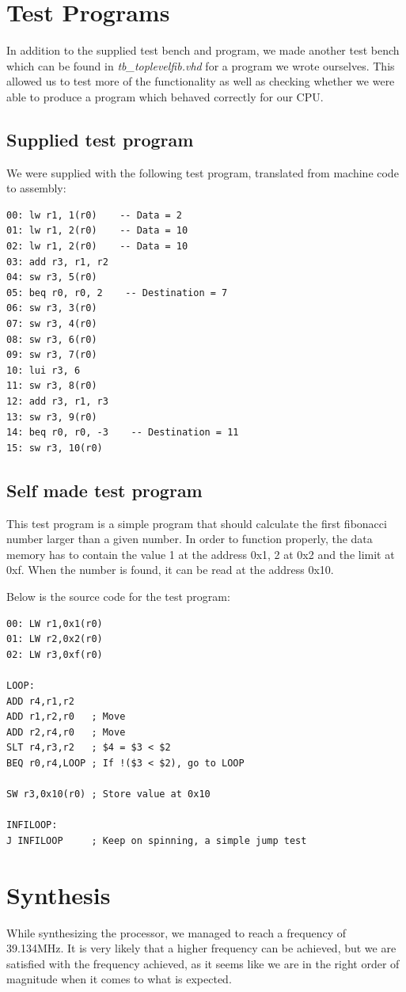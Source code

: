 \section{Test Programs}
In addition to the supplied test bench and program, we made another test bench which can be found in \emph{tb_toplevelfib.vhd} for a program we wrote ourselves.
This allowed us to test more of the functionality as well as checking whether we were able to produce a program which behaved correctly for our CPU.

\subsection{Supplied test program}
We were supplied with the following test program, translated from machine code to assembly:
\begin{verbatim}
00: lw r1, 1(r0)    -- Data = 2
01: lw r1, 2(r0)    -- Data = 10
02: lw r1, 2(r0)    -- Data = 10
03: add r3, r1, r2
04: sw r3, 5(r0)
05: beq r0, r0, 2    -- Destination = 7
06: sw r3, 3(r0)
07: sw r3, 4(r0)
08: sw r3, 6(r0)
09: sw r3, 7(r0)
10: lui r3, 6
11: sw r3, 8(r0)
12: add r3, r1, r3
13: sw r3, 9(r0)
14: beq r0, r0, -3    -- Destination = 11
15: sw r3, 10(r0)
\end{verbatim}

\subsection{Self made test program}
This test program is a simple program that should calculate the first fibonacci number larger than a given number.
In order to function properly, the data memory has to contain the value 1 at the address 0x1, 2 at 0x2 and the limit at 0xf.
When the number is found, it can be read at the address 0x10.

Below is the source code for the test program:
\begin{verbatim}
00: LW r1,0x1(r0)
01: LW r2,0x2(r0)
02: LW r3,0xf(r0)

LOOP:
ADD r4,r1,r2
ADD r1,r2,r0   ; Move
ADD r2,r4,r0   ; Move
SLT r4,r3,r2   ; $4 = $3 < $2
BEQ r0,r4,LOOP ; If !($3 < $2), go to LOOP

SW r3,0x10(r0) ; Store value at 0x10

INFILOOP:
J INFILOOP     ; Keep on spinning, a simple jump test
\end{verbatim}

\section{Synthesis}
While synthesizing the processor, we managed to reach a frequency of 39.134MHz.
It is very likely that a higher frequency can be achieved, but we are satisfied with the frequency achieved, as it seems like we are in the right order of magnitude when it comes to what is expected.

